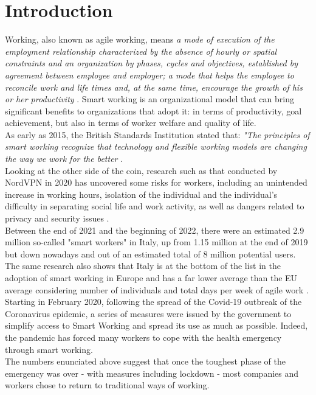 \documentclass[12pt,journal,compsoc]{IEEEtran}
\begin{document}
\section{Introduction}
 Working, also known as agile working, means \textit{a mode of execution of the employment relationship characterized by the absence of hourly or spatial constraints and an organization by phases, cycles and objectives, established by agreement between employee and employer; a mode that helps the employee to reconcile work and life times and, at the same time, encourage the growth of his or her productivity} \cite{Gazzetta} \cite{MIUR}.
Smart working is an organizational model that can bring significant benefits to organizations that adopt it: in terms of productivity, goal achievement, but also in terms of worker welfare and quality of life.\\
As early as 2015, the British Standards Institution stated that: \textit{"The principles of smart working recognize that technology and flexible working models are changing the way we work for the better} \cite{BSI}.\\
Looking at the other side of the coin, research such as that conducted by NordVPN in 2020 has uncovered some risks for workers, including an unintended increase in working hours, isolation of the individual and the individual's difficulty in separating social life and work activity, as well as dangers related to privacy and security issues \cite{Forbes}.\\
Between the end of 2021 and the beginning of 2022, there were an estimated 2.9 million so-called "smart workers" in Italy, up from 1.15 million at the end of 2019 but down nowadays and out of an estimated total of 8 million potential users. The same research also shows that Italy is at the bottom of the list in the adoption of smart working in Europe and has a far lower average than the EU average considering number of individuals and total days per week of agile work \cite{Rai}.\\
Starting in February 2020, following the spread of the Covid-19 outbreak of the Coronavirus epidemic, a series of measures were issued by the government to simplify access to Smart Working and spread its use as much as possible. Indeed, the pandemic has forced many workers to cope with the health emergency through smart working.\\
The numbers enunciated above suggest that once the toughest phase of the emergency was over - with measures including lockdown - most companies and workers chose to return to traditional ways of working.\\
\end{document}
